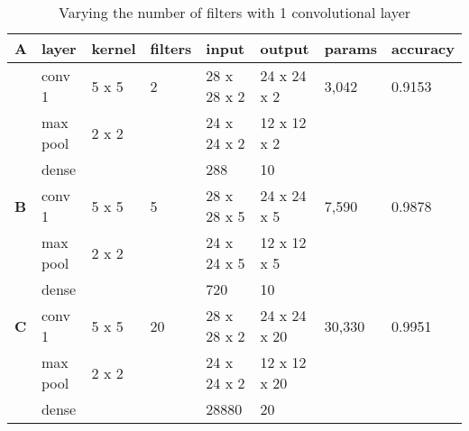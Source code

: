 \documentclass[conference,compsoc]{IEEEtran}
\begin{document}
\begin{table*}
\centering
\begin{tabular}[t]{l l l l l l |l l}
\toprule
 \textbf{A} & layer &   kernel & filters & input & output & params &accuracy\\
\midrule
  & conv 1 &   5 x 5 &      2 &       28 x 28 x 2 & 24 x 24 x 2 &3,042& 0.9153\\
  & max pool &   2 x 2 &       &       24 x 24 x 2 & 12 x 12 x 2 \\
  &  dense &    &       &       288 & 10 \\

\midrule                                                  
  \textbf{B}    & conv 1 &   5 x 5 &      5 &       28 x 28 x 5 & 24 x 24 x 5 & 7,590 & 0.9878 \\
  & max pool &   2 x 2 &       &       24 x 24 x 5 & 12 x 12 x 5 \\
  &  dense &    &       &       720 & 10 \\

\midrule                                                  
   \textbf{C}    & conv 1 &   5 x 5 &      20 &       28 x 28 x 2 & 24 x 24 x 20 & 30,330 &0.9951 \\
  & max pool &   2 x 2 &       &       24 x 24 x 2 & 12 x 12 x 20 \\
  &  dense &    &       &       28880 & 20 \\

\bottomrule
\end{tabular}

\label{tab:table1_a}

\caption{Varying the number of filters with 1 convolutional layer}
\label{cnnt1}
\end{table*}
\end{document}
